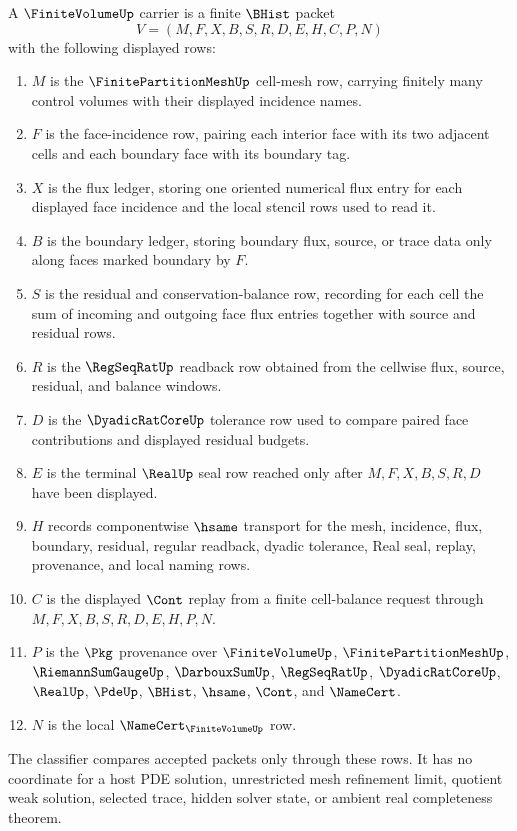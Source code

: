 \begin{definition}
\label{def:finite-volume-carrier}
A $\FiniteVolumeUp$ carrier is a finite $\BHist$ packet
$$
V=(M,F,X,B,S,R,D,E,H,C,P,N)
$$
with the following displayed rows:
\begin{enumerate}
\item $M$ is the $\FinitePartitionMeshUp$ cell-mesh row, carrying finitely many control volumes with their displayed incidence names.
\item $F$ is the face-incidence row, pairing each interior face with its two adjacent cells and each boundary face with its boundary tag.
\item $X$ is the flux ledger, storing one oriented numerical flux entry for each displayed face incidence and the local stencil rows used to read it.
\item $B$ is the boundary ledger, storing boundary flux, source, or trace data only along faces marked boundary by $F$.
\item $S$ is the residual and conservation-balance row, recording for each cell the sum of incoming and outgoing face flux entries together with source and residual rows.
\item $R$ is the $\RegSeqRatUp$ readback row obtained from the cellwise flux, source, residual, and balance windows.
\item $D$ is the $\DyadicRatCoreUp$ tolerance row used to compare paired face contributions and displayed residual budgets.
\item $E$ is the terminal $\RealUp$ seal row reached only after $M,F,X,B,S,R,D$ have been displayed.
\item $H$ records componentwise $\hsame$ transport for the mesh, incidence, flux, boundary, residual, regular readback, dyadic tolerance, Real seal, replay, provenance, and local naming rows.
\item $C$ is the displayed $\Cont$ replay from a finite cell-balance request through $M,F,X,B,S,R,D,E,H,P,N$.
\item $P$ is the $\Pkg$ provenance over $\FiniteVolumeUp$, $\FinitePartitionMeshUp$, $\RiemannSumGaugeUp$, $\DarbouxSumUp$, $\RegSeqRatUp$, $\DyadicRatCoreUp$, $\RealUp$, $\PdeUp$, $\BHist$, $\hsame$, $\Cont$, and $\NameCert$.
\item $N$ is the local $\NameCert_{\FiniteVolumeUp}$ row.
\end{enumerate}
The classifier compares accepted packets only through these rows. It has no coordinate for a host PDE solution, unrestricted mesh refinement limit, quotient weak solution, selected trace, hidden solver state, or ambient real completeness theorem.
\end{definition}

